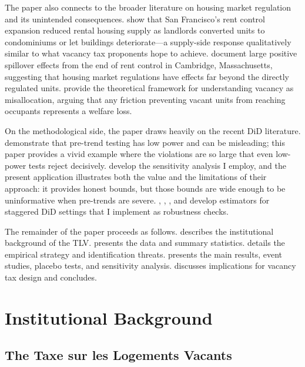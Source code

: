 \documentclass[12pt]{article}
\begin{document}
The paper also connects to the broader literature on housing market regulation and its unintended consequences. \citet{diamond2019effects} show that San Francisco's rent control expansion reduced rental housing supply as landlords converted units to condominiums or let buildings deteriorate---a supply-side response qualitatively similar to what vacancy tax proponents hope to achieve. \citet{autor2014housing} document large positive spillover effects from the end of rent control in Cambridge, Massachusetts, suggesting that housing market regulations have effects far beyond the directly regulated units. \citet{glaeser2003misallocation} provide the theoretical framework for understanding vacancy as misallocation, arguing that any friction preventing vacant units from reaching occupants represents a welfare loss.

On the methodological side, the paper draws heavily on the recent DiD literature. \citet{roth2023pretest} demonstrate that pre-trend testing has low power and can be misleading; this paper provides a vivid example where the violations are so large that even low-power tests reject decisively. \citet{rambachan2023more} develop the sensitivity analysis I employ, and the present application illustrates both the value and the limitations of their approach: it provides honest bounds, but those bounds are wide enough to be uninformative when pre-trends are severe. \citet{callaway2021difference}, \citet{goodmanbacon2021difference}, \citet{sunabraham2021estimating}, and \citet{borusyak2024revisiting} develop estimators for staggered DiD settings that I implement as robustness checks.

The remainder of the paper proceeds as follows.  describes the institutional background of the TLV.  presents the data and summary statistics.  details the empirical strategy and identification threats.  presents the main results, event studies, placebo tests, and sensitivity analysis.  discusses implications for vacancy tax design and  concludes.


\section{Institutional Background}\label{sec:background}

\subsection{The Taxe sur les Logements Vacants}
\end{document}
